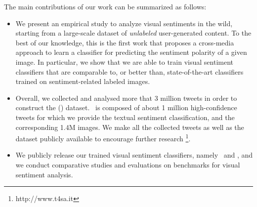 The main contributions of our work can be summarized as follows:
\begin{itemize}
  \item %
  We present an empirical study to analyze visual sentiments in the wild,
  starting from a large-scale dataset of \textit{unlabeled} user-generated content.
  To the best of our knowledge, this is the first work that proposes %
  a cross-media approach to learn a classifier for predicting the sentiment polarity of a given image.
  In particular, we show that we are able to train visual sentiment classifiers that are comparable to, or better than, state-of-the-art classifiers trained on sentiment-related labeled images.
  \item Overall, we collected and analysed more that 3 million tweets in order to construct the \textit{\NomeTSA} (\TSA) dataset.
  \TSA\ is composed of about 1 million high-confidence tweets for which we provide the textual sentiment classification, and the corresponding 1.4M images.
  We make all the collected tweets as well as the {\TSA} dataset publicly available to encourage further research \footnote{http://www.t4sa.it}.
  \item We publicly release our trained visual sentiment classifiers, namely  \textit{\ourFtAlex}\, and \textit{\ourFtVGG}, %
  and we conduct comparative studies and evaluations on benchmarks for visual sentiment analysis.
\end{itemize}


